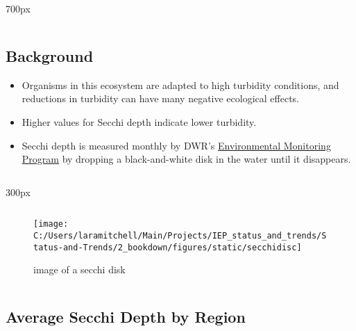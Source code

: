 \documentclass[
]{book}
\providecommand{\tightlist}{%
  \setlength{\itemsep}{0pt}\setlength{\parskip}{0pt}}
\begin{document}
\begin{columns2}

\begin{column}{700px\textwidth}
\begin{column}

\hypertarget{background}{%
\subsection{Background}\label{background}}

\begin{itemize}
\tightlist
\item
  Organisms in this ecosystem are adapted to high turbidity conditions, and reductions in turbidity can have many negative ecological effects.
\item
  Higher values for Secchi depth indicate lower turbidity.
\item
  Secchi depth is measured monthly by DWR's \href{https://emp.baydeltalive.com/wiki/12297}{Environmental Monitoring Program} by dropping a black-and-white disk in the water until it disappears.
\end{itemize}

\end{column}
\end{column}

\begin{column}{300px\textwidth}
\begin{column}

\begin{figure}

{\centering \texttt{[image: C:/Users/laramitchell/Main/Projects/IEP\_status\_and\_trends/Status-and-Trends/2\_bookdown/figures/static/secchidisc]} 

}

\caption{image of a secchi disk}\label{fig:unnamed-chunk-6}
\end{figure}

\end{column}
\end{column}

\end{columns2}

\hypertarget{average-secchi-depth-by-region}{%
\subsection{Average Secchi Depth by Region}\label{average-secchi-depth-by-region}}
\end{document}
